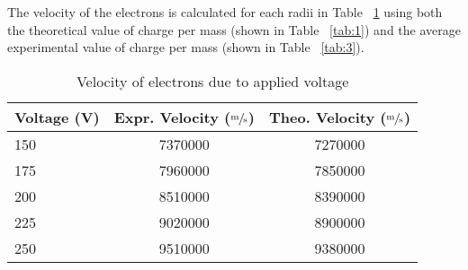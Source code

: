 \documentclass [12pt, letterpaper, twoside] {article}
\begin{document}
\begin{enumerate}
      The velocity of the electrons is calculated for each radii in Table ~\ref{tab:4} using both the theoretical value of charge per mass (shown in Table ~\ref{tab:1}) and the average experimental value of charge per mass (shown in Table ~\ref{tab:3}).

      \begin{table}
        \centering
        \begin{tabular}{| l | c | c |}
          \hline\hline
          Voltage (V) & Expr. Velocity (\(\sfrac{\text{m}}{\text{s}}\)) & Theo. Velocity (\(\sfrac{\text{m}}{\text{s}}\)) \\
          \hline
          150 & 7370000 & 7270000 \\ %
          \hline
          175 & 7960000 & 7850000 \\ %
          \hline
          200 & 8510000 & 8390000 \\ %
          \hline
          225 & 9020000 & 8900000 \\ %
          \hline
          250 & 9510000 & 9380000 \\ %
          \hline\hline
        \end{tabular}
        \caption{Velocity of electrons due to applied voltage}
        \label{tab:4}
      \end{table}
\end{enumerate}
\end{document}
